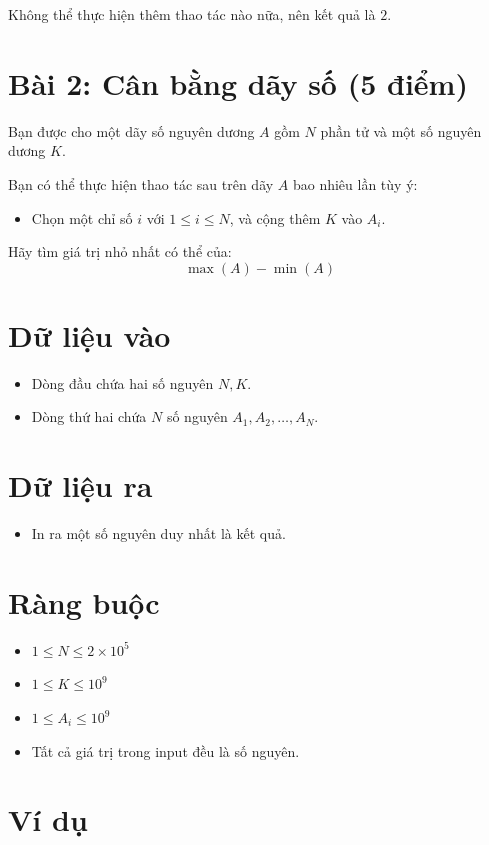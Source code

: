 Không thể thực hiện thêm thao tác nào nữa, nên kết quả là $2$.
\newpage
\section*{Bài 2: Cân bằng dãy số (5 điểm)}
Bạn được cho một dãy số nguyên dương $A$ gồm $N$ phần tử và một số nguyên dương $K$.

Bạn có thể thực hiện thao tác sau trên dãy $A$ bao nhiêu lần tùy ý:
\begin{itemize}
    \item Chọn một chỉ số $i$ với $1 \le i \le N$, và cộng thêm $K$ vào $A_i$.
\end{itemize}

Hãy tìm giá trị nhỏ nhất có thể của:
$$
\max(A) - \min(A)
$$

\section*{Dữ liệu vào}

\begin{itemize}
    \item Dòng đầu chứa hai số nguyên $N, K$.
    \item Dòng thứ hai chứa $N$ số nguyên $A_1, A_2, \ldots, A_N$.
\end{itemize}

\section*{Dữ liệu ra}

\begin{itemize}
    \item In ra một số nguyên duy nhất là kết quả.
\end{itemize}

\section*{Ràng buộc}

\begin{itemize}
    \item $1 \le N \le 2 \times 10^5$
    \item $1 \le K \le 10^9$
    \item $1 \le A_i \le 10^9$
    \item Tất cả giá trị trong input đều là số nguyên.
\end{itemize}

\section*{Ví dụ}

